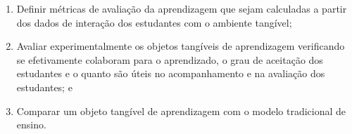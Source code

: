 

\begin{enumerate}
	\item Definir métricas de avaliação da aprendizagem que sejam calculadas a partir dos dados de interação dos estudantes com o ambiente tangível;
	\item  Avaliar experimentalmente os objetos tangíveis de aprendizagem verificando se efetivamente colaboram para o aprendizado, o grau de aceitação dos estudantes e o quanto são úteis no acompanhamento e na avaliação dos estudantes; e
	\item Comparar um objeto tangível de aprendizagem com o modelo tradicional de ensino.
\end{enumerate}

